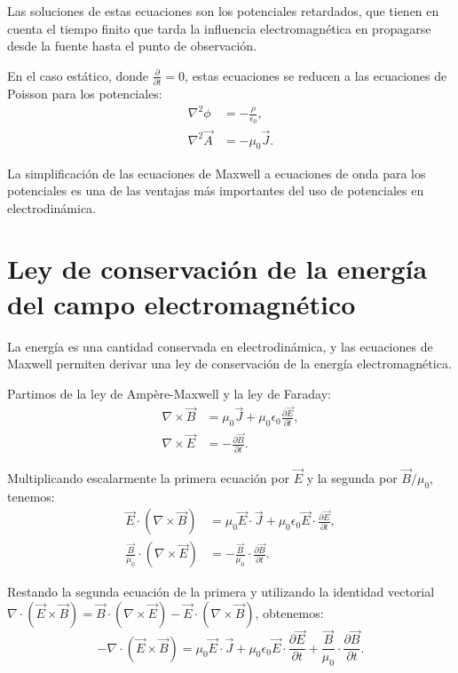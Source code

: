 \documentclass[12pt,a4paper]{book}
\begin{document}
Las soluciones de estas ecuaciones son los potenciales retardados, que tienen en cuenta el tiempo finito que tarda la influencia electromagnética en propagarse desde la fuente hasta el punto de observación.

En el caso estático, donde $\frac{\partial}{\partial t} = 0$, estas ecuaciones se reducen a las ecuaciones de Poisson para los potenciales:
\begin{align}
\nabla^2 \phi &= -\frac{\rho}{\epsilon_0}, \\
\nabla^2 \vec{A} &= -\mu_0 \vec{J}.
\end{align}

La simplificación de las ecuaciones de Maxwell a ecuaciones de onda para los potenciales es una de las ventajas más importantes del uso de potenciales en electrodinámica.

\section{Ley de conservación de la energía del campo electromagnético}

La energía es una cantidad conservada en electrodinámica, y las ecuaciones de Maxwell permiten derivar una ley de conservación de la energía electromagnética.

Partimos de la ley de Ampère-Maxwell y la ley de Faraday:
\begin{align}
\nabla \times \vec{B} &= \mu_0 \vec{J} + \mu_0 \epsilon_0 \frac{\partial \vec{E}}{\partial t}, \\
\nabla \times \vec{E} &= -\frac{\partial \vec{B}}{\partial t}.
\end{align}

Multiplicando escalarmente la primera ecuación por $\vec{E}$ y la segunda por $\vec{B}/\mu_0$, tenemos:
\begin{align}
\vec{E} \cdot (\nabla \times \vec{B}) &= \mu_0 \vec{E} \cdot \vec{J} + \mu_0 \epsilon_0 \vec{E} \cdot \frac{\partial \vec{E}}{\partial t}, \\
\frac{\vec{B}}{\mu_0} \cdot (\nabla \times \vec{E}) &= -\frac{\vec{B}}{\mu_0} \cdot \frac{\partial \vec{B}}{\partial t}.
\end{align}

Restando la segunda ecuación de la primera y utilizando la identidad vectorial $\nabla \cdot (\vec{E} \times \vec{B}) = \vec{B} \cdot (\nabla \times \vec{E}) - \vec{E} \cdot (\nabla \times \vec{B})$, obtenemos:
\begin{equation}
-\nabla \cdot (\vec{E} \times \vec{B}) = \mu_0 \vec{E} \cdot \vec{J} + \mu_0 \epsilon_0 \vec{E} \cdot \frac{\partial \vec{E}}{\partial t} + \frac{\vec{B}}{\mu_0} \cdot \frac{\partial \vec{B}}{\partial t}.
\end{equation}
\end{document}
